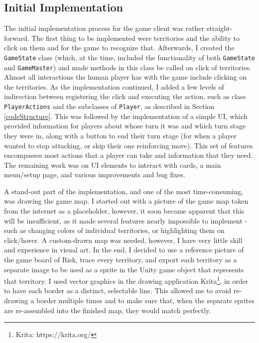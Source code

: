 \subsection{Initial Implementation}
\label{initialImplementation}
The initial implementation process for the game client was rather straight-forward. The first thing to be implemented were territories and the ability to click on them and for the game to recognize that. Afterwards, I created the \texttt{GameState} class (which, at the time, included the functionality of both \texttt{GameState} and \texttt{GameMaster}) and made methods in this class be called on click of territories. Almost all interactions the human player has with the game include clicking on the territories. As the implementation continued, I added a few levels of indirection between registering the click and executing the action, such as class \texttt{PlayerActions} and the subclasses of \texttt{Player}, as described in Section \ref{codeStructure}. This was followed by the implementation of a simple UI, which provided information for players about whose turn it was and which turn stage they were in, along with a button to end their turn stage (for when a player wanted to stop attacking, or skip their one reinforcing move). This set of features encompasses most actions that a player can take and information that they need. The remaining work was on UI elements to interact with cards, a main menu/setup page, and various improvements and bug fixes.

A stand-out part of the implementation, and one of the most time-consuming, was drawing the game map. I started out with a picture of the game map taken from the internet as a placeholder, however, it soon became apparent that this will be insufficient, as it made several features nearly impossible to implement - such as changing colors of individual territories, or highlighting them on click/hover. A custom-drawn map was needed, however, I have very little skill and experience in visual art. In the end, I decided to use a reference picture of the game board of Risk, trace every territory, and export each territory as a separate image to be used as a sprite in the Unity game object that represents that territory. I used vector graphics in the drawing application Krita\footnote{Krita: https://krita.org/}, in order to have each border as a distinct, selectable line. This allowed me to avoid re-drawing a border multiple times and to make sure that, when the separate sprites are re-assembled into the finished map, they would match perfectly.

